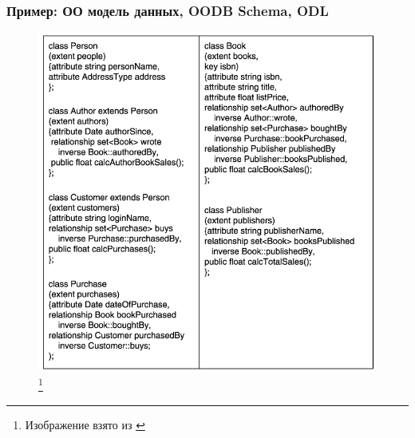 \documentclass{beamer}
\begin{document}
\begin{frame}[t]
\frametitle{Пример: ОО модель данных, OODB Schema, ODL}

\begin{figure}[htb]
\includegraphics[width=\textwidth,height=0.77\textheight,keepaspectratio]{object-oriented-data-model.png} 
\footnote{\tiny{Изображение взято из \cite{Urban2009}}}
\end{figure}    
  
\end{frame}
\end{document}
